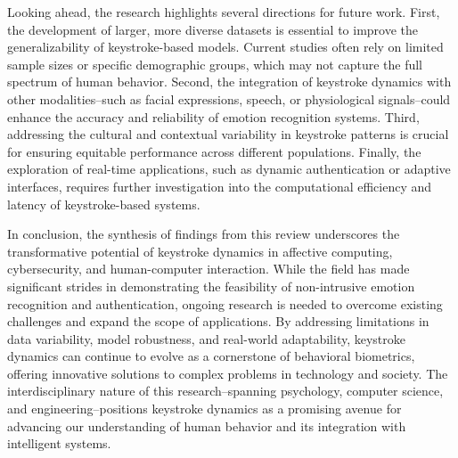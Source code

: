 \documentclass[conference]{IEEEtran}
\begin{document}
Looking ahead, the research highlights several directions for future work. First, the development of larger, more diverse datasets is essential to improve the generalizability of keystroke-based models. Current studies often rely on limited sample sizes or specific demographic groups, which may not capture the full spectrum of human behavior. Second, the integration of keystroke dynamics with other modalities--such as facial expressions, speech, or physiological signals--could enhance the accuracy and reliability of emotion recognition systems. Third, addressing the cultural and contextual variability in keystroke patterns is crucial for ensuring equitable performance across different populations. Finally, the exploration of real-time applications, such as dynamic authentication or adaptive interfaces, requires further investigation into the computational efficiency and latency of keystroke-based systems.  

In conclusion, the synthesis of findings from this review underscores the transformative potential of keystroke dynamics in affective computing, cybersecurity, and human-computer interaction. While the field has made significant strides in demonstrating the feasibility of non-intrusive emotion recognition and authentication, ongoing research is needed to overcome existing challenges and expand the scope of applications. By addressing limitations in data variability, model robustness, and real-world adaptability, keystroke dynamics can continue to evolve as a cornerstone of behavioral biometrics, offering innovative solutions to complex problems in technology and society. The interdisciplinary nature of this research--spanning psychology, computer science, and engineering--positions keystroke dynamics as a promising avenue for advancing our understanding of human behavior and its integration with intelligent systems.
\end{document}
